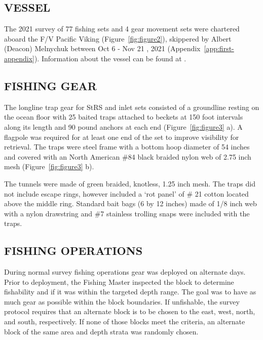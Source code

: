 \documentclass[12pt]{article}\usepackage[]{graphicx}\usepackage[]{color}
\begin{document}
\hypertarget{vessel}{%
\subsection{VESSEL}\label{vessel}}

The 2021 survey of 77 fishing sets and 4 gear movement sets were chartered aboard the F/V Pacific Viking (Figure~\ref{fig:figure2}), skippered by Albert (Deacon) Melnychuk between Oct 6 - Nov 21 , 2021 (Appendix~\ref{app:first-appendix}). Information about the vessel can be found at .

\hypertarget{fishing-gear}{%
\subsection{FISHING GEAR}\label{fishing-gear}}

The longline trap gear for StRS and inlet sets consisted of a groundline resting on the ocean floor with 25 baited traps attached to beckets at 150 foot intervals along its length and 90 pound anchors at each end (Figure~\ref{fig:figure3} a). A flagpole was required for at least one end of the set to improve visibility for retrieval. The traps were steel frame with a bottom hoop diameter of 54 inches and covered with an North American \#84 black braided nylon web of 2.75 inch mesh (Figure~\ref{fig:figure3} b).

The tunnels were made of green braided, knotless, 1.25 inch mesh. The traps did not include escape rings, however included a `rot panel' of \# 21 cotton located above the middle ring. Standard bait bags (6 by 12 inches) made of 1/8 inch web with a nylon drawstring and \#7 stainless trolling snaps were included with the traps.

\hypertarget{fishing-operations}{%
\subsection{FISHING OPERATIONS}\label{fishing-operations}}

During normal survey fishing operations gear was deployed on alternate days. Prior to deployment, the Fishing Master inspected the block to determine fishability and if it was within the targeted depth range. The goal was to have as much gear as possible within the block boundaries. If unfishable, the survey protocol requires that an alternate block is to be chosen to the east, west, north, and south, respectively. If none of those blocks meet the criteria, an alternate block of the same area and depth strata was randomly chosen.
\end{document}

